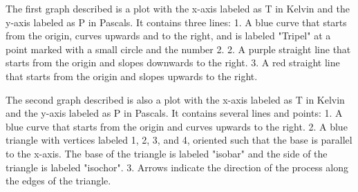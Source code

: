 The first graph described is a plot with the x-axis labeled as T in Kelvin and the y-axis labeled as P in Pascals. It contains three lines:
1. A blue curve that starts from the origin, curves upwards and to the right, and is labeled "Tripel" at a point marked with a small circle and the number 2.
2. A purple straight line that starts from the origin and slopes downwards to the right.
3. A red straight line that starts from the origin and slopes upwards to the right.

The second graph described is also a plot with the x-axis labeled as T in Kelvin and the y-axis labeled as P in Pascals. It contains several lines and points:
1. A blue curve that starts from the origin and curves upwards to the right.
2. A blue triangle with vertices labeled 1, 2, 3, and 4, oriented such that the base is parallel to the x-axis. The base of the triangle is labeled "isobar" and the side of the triangle is labeled "isochor".
3. Arrows indicate the direction of the process along the edges of the triangle.
